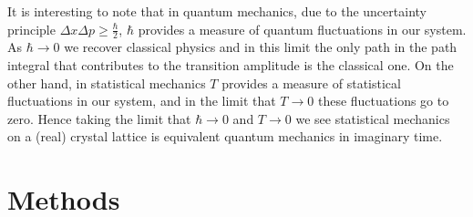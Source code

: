 \documentclass[12pt]{article}
\begin{document}
        It is interesting to note that in quantum mechanics, due to the uncertainty principle $\Delta x\Delta p \geq \frac{\hbar}{2}$, $\hbar$ provides a measure of quantum fluctuations in our system. As $\hbar \rightarrow 0$ we recover classical physics and in this limit the only path in the path integral that contributes to the transition amplitude is the classical one. On the other hand, in statistical mechanics $T$ provides a measure of statistical fluctuations in our system, and in the limit that $T \rightarrow 0$ these fluctuations go to zero. Hence taking the limit that $\hbar \rightarrow 0$ and $T \rightarrow 0$ we see statistical mechanics on a (real) crystal lattice is equivalent quantum mechanics in imaginary time.



\section{Methods}
\end{document}
